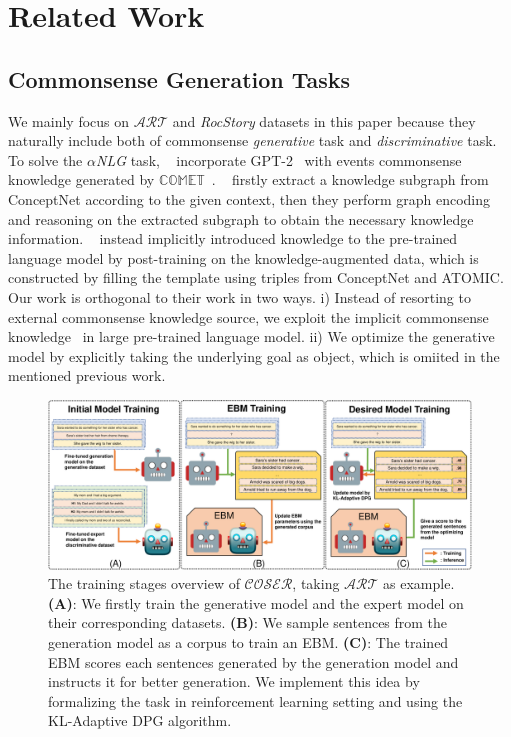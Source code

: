 \section{Related Work}

\subsection{Commonsense Generation Tasks}

We mainly focus on $\mathcal{ART}$ and \textit{RocStory} datasets in this paper because they
naturally include both of commonsense \textit{generative} task and \textit{discriminative} task.
To solve the $\alpha$\textit{NLG} task, ~\citet{Bhagavatula2020Abductive} incorporate GPT-2~\citep{gpt2} 
with events commonsense knowledge generated by $\mathbb{COMET}$~\citep{comet}. 
~\citet{grf} firstly extract a knowledge subgraph from ConceptNet according to the given context,
then they perform graph encoding and reasoning on the extracted subgraph to obtain the necessary
knowledge information. ~\citet{DBLP:journals/tacl/GuanHHZZ20} instead implicitly introduced knowledge 
to the pre-trained language model by post-training on the knowledge-augmented data, which is constructed
by filling the template using triples from ConceptNet and ATOMIC. 
Our work is orthogonal to their work in two ways. i) Instead of resorting
to external commonsense knowledge source, we exploit the implicit commonsense knowledge~\citep{DBLP:conf/nips/TalmorTCGB20,DBLP:conf/emnlp/PetroniRRLBWM19,DBLP:conf/emnlp/DavisonFR19}
in large pre-trained language model. ii) We optimize the generative model by explicitly taking
the underlying goal as object, which is omiited in the mentioned previous work.
\begin{figure}[ht]
    \centering
    \includegraphics[width=1.0\textwidth]{figs/overview_graph.pdf}
    \caption{The training stages overview of $\mathcal{COSER}$, taking $\mathcal{ART}$ as example. 
    \textbf{(A)}: We firstly train the generative model and the expert model on their corresponding datasets.
    \textbf{(B)}: We sample sentences from the generation model as a corpus to train an EBM.
    \textbf{(C)}: The trained EBM scores each sentences generated by the generation model and instructs it
    for better generation. We implement this idea by formalizing the task in reinforcement learning setting
    and using the KL-Adaptive DPG algorithm.
    }
    \label{fig:overview}
\end{figure}

